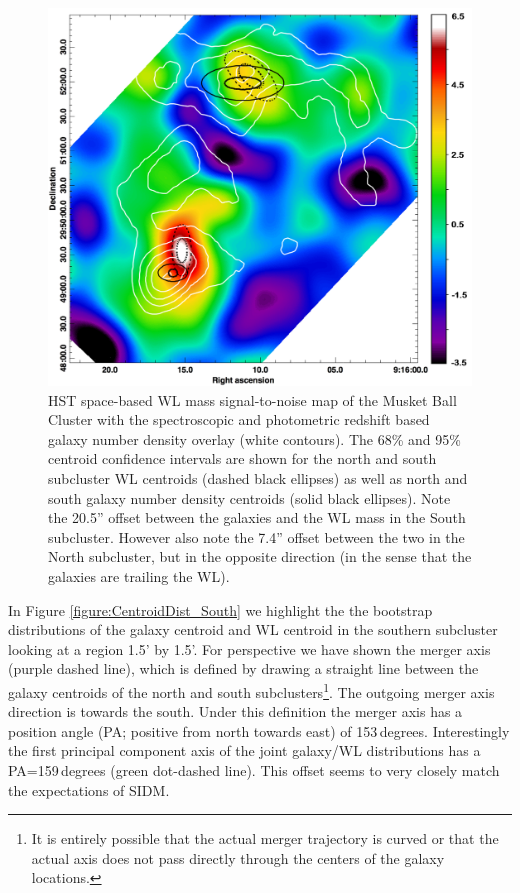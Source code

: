 \begin{figure}
\centering
\includegraphics[width=5in]{Chapter4/LensingGalaxyOverlay.png}
\caption[Musket Ball Cluster weak lensing signal-to-noise map with galaxy number density map overlay, including centroid locations.]{
HST space-based WL mass signal-to-noise map of the Musket Ball Cluster with the spectroscopic and photometric redshift based galaxy number density overlay (white contours).
The 68\% and 95\% centroid confidence intervals are shown for the north and south subcluster WL centroids (dashed black ellipses) as well as north and south galaxy number density centroids (solid black ellipses).
Note the 20.5'' offset between the galaxies and the WL mass in the South subcluster.
However also note the 7.4'' offset between the two in the North subcluster, but in the opposite direction (in the sense that the galaxies are trailing the WL).
}
\label{figure:LensingGalaxyOverlay}
\end{figure}

In Figure \ref{figure:CentroidDist_South} we highlight the the bootstrap distributions of the galaxy centroid and WL centroid in the southern subcluster looking at a region 1.5' by 1.5'.
For perspective we have shown the merger axis (purple dashed line), which is defined by drawing a straight line between the galaxy centroids of the north and south subclusters\footnote{It is entirely possible that the actual merger trajectory is curved or that the actual axis does not pass directly through the centers of the galaxy locations.}.
The outgoing merger axis direction is towards the south.
Under this definition the merger axis has a position angle (PA; positive from north towards east) of 153\,degrees.
Interestingly the first principal component axis of the joint galaxy/WL distributions has a PA=159\,degrees (green dot-dashed line).
This offset seems to very closely match the expectations of SIDM.

